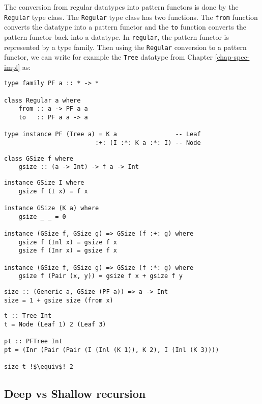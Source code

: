 The conversion from regular datatypes into pattern functors is done by the \texttt{Regular} type class. The \texttt{Regular} type class has two functions. The \texttt{from} function converts the datatype into a pattern functor and the \texttt{to} function converts the pattern functor back into a datatype. In \texttt{regular}, the pattern functor is represented by a type family. Then using the \texttt{Regular} conversion to a pattern functor, we can write for example the \texttt{Tree} datatype from Chapter \ref{chap-spec-impl} as:

\begin{verbatim}
type family PF a :: * -> *

class Regular a where
    from :: a -> PF a a
    to   :: PF a a -> a

type instance PF (Tree a) = K a                -- Leaf
                         :+: (I :*: K a :*: I) -- Node
\end{verbatim}

\begin{verbatim}
class GSize f where
    gsize :: (a -> Int) -> f a -> Int
\end{verbatim}

\begin{verbatim}
instance GSize I where
    gsize f (I x) = f x

instance GSize (K a) where
    gsize _ _ = 0

instance (GSize f, GSize g) => GSize (f :+: g) where
    gsize f (Inl x) = gsize f x
    gsize f (Inr x) = gsize f x

instance (GSize f, GSize g) => GSize (f :*: g) where
    gsize f (Pair (x, y)) = gsize f x + gsize f y
\end{verbatim}

\begin{verbatim}
size :: (Generic a, GSize (PF a)) => a -> Int
size = 1 + gsize size (from x)
\end{verbatim}


\begin{verbatim}
t :: Tree Int
t = Node (Leaf 1) 2 (Leaf 3)

pt :: PFTree Int
pt = (Inr (Pair (Pair (I (Inl (K 1)), K 2), I (Inl (K 3)))) 

size t !$\equiv$! 2
\end{verbatim}

\subsection{Deep vs Shallow recursion}

